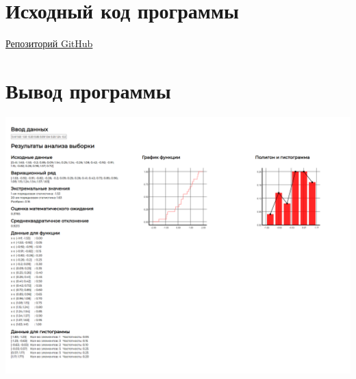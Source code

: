 \documentclass[12pt,a4paper]{report}
\begin{document}
\section*{Исходный код программы}
\href{https://github.com/Armemius/number-sampling-analyzer}{Репозиторий GitHub}
\section*{Вывод программы}
\begin{center}
    \includegraphics[width=15cm]{screenshot.png}
\end{center}
\end{document}
